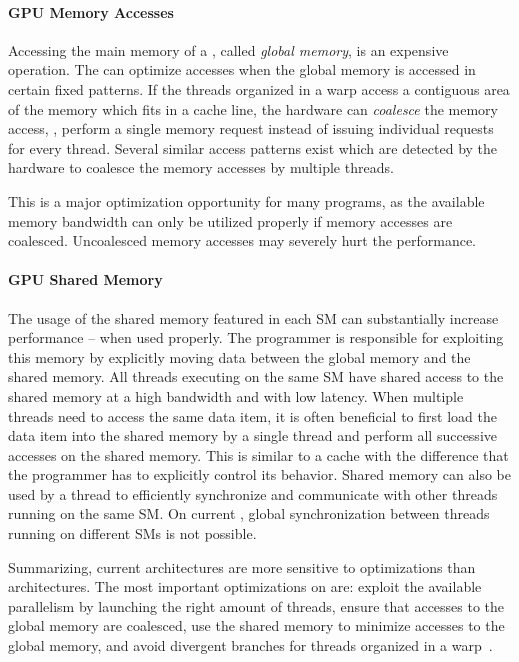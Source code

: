 \paragraph{GPU Memory Accesses}
Accessing the main memory of a \GPU, called \emph{global memory}, is an expensive operation.
The \GPU can optimize accesses when the global memory is accessed in certain fixed patterns.
If the threads organized in a warp access a contiguous area of the memory which fits in a cache line, the hardware can \emph{coalesce} the memory access, \ie, perform a single memory request instead of issuing individual requests for every thread.
Several similar access patterns exist which are detected by the hardware to coalesce the memory accesses by multiple threads.

This is a major optimization opportunity for many \GPU programs, as the available memory bandwidth can only be utilized properly if memory accesses are coalesced.
Uncoalesced memory accesses may severely hurt the performance.


\paragraph{GPU Shared Memory}
The usage of the shared memory featured in each SM can substantially increase performance -- when used properly.
The programmer is responsible for exploiting this memory by explicitly moving data between the global memory and the shared memory.
All threads executing on the same SM have shared access to the shared memory at a high bandwidth and with low latency.
When multiple threads need to access the same data item, it is often beneficial to first load the data item into the shared memory by a single thread and perform all successive accesses on the shared memory.
This is similar to a cache with the difference that the programmer has to explicitly control its behavior.
Shared memory can also be used by a thread to efficiently synchronize and communicate with other threads running on the same SM.
On current \GPUs, global synchronization between threads running on different SMs is not possible.

\bigskip
Summarizing, current \GPU architectures are more sensitive to optimizations than \CPU architectures.
The most important optimizations on \GPUs are:
exploit the available parallelism by launching the right amount of threads, ensure that accesses to the global memory are coalesced, use the shared memory to minimize accesses to the global memory, and avoid divergent branches for threads organized in a warp~\cite{CUDATuningKepler2015}.

